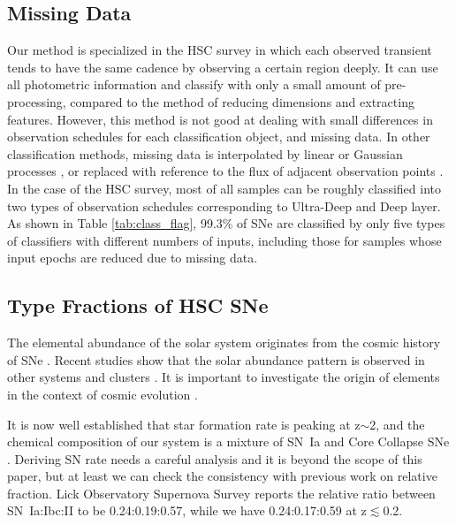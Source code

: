 \documentclass[useamsfonts]{pasj01}
\begin{document}
\subsection{Missing Data}
%
Our method is specialized in the HSC survey in which each observed transient tends to have the same cadence by observing a certain region deeply.
It can use all photometric information and classify with only a small amount of pre-processing, compared to the method of reducing dimensions and extracting features. 
However, this method is not good at dealing with small differences in observation schedules for each classification object, and missing data.
In other classification methods, missing data is interpolated by linear or Gaussian processes \citep{Lochner_2016,Muthukrishna_2019}, or replaced with reference to the flux of adjacent observation points \citep{charnock17a}.
In the case of the HSC survey, most of all samples can be roughly classified into two types of observation schedules corresponding to Ultra-Deep and Deep layer.
As shown in Table \ref{tab:class_flag}, 99.3\% of SNe are classified by only five types of classifiers with different numbers of inputs, including those for samples whose input epochs are reduced due to missing data.
%
%
\subsection{Type Fractions of HSC SNe}
The elemental abundance of the solar system \citep{grevesse98a} originates from the cosmic history of SNe \citep{maraston05a,kobayashi00a}.  
Recent studies show that the solar abundance pattern is observed in other systems \citep{ramirez09a} and clusters \citep{mernier18a}. 
It is important to investigate the origin of elements in the context of cosmic evolution \citep{fukugita04a}. 

It is now well established that star formation rate is peaking at z$\sim$2, and the chemical composition of our system is a mixture of SN~Ia and Core Collapse SNe \citep{tsujimoto95a,kobayashi11a}.
Deriving SN rate needs a careful analysis \citep{dilday08a,brown19a,frohmaier19a} and it is beyond the scope of this paper, but at least we can check the consistency with previous work on relative fraction.
Lick Observatory Supernova Survey \citep{li11a} reports the relative ratio between SN~Ia:Ibc:II to be 0.24:0.19:0.57, while we have 0.24:0.17:0.59 at z$\lesssim$0.2. 
\end{document}
